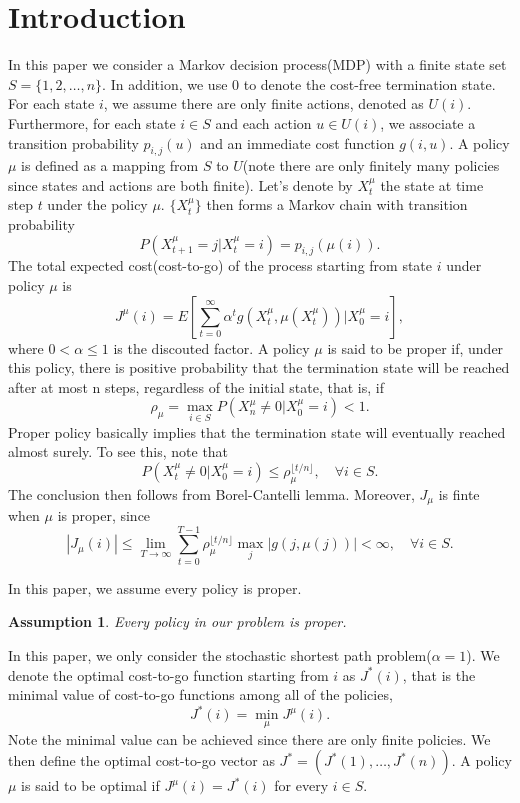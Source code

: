 \documentclass[12pt,a4paper]{amsart}
\numberwithin{equation}{section}
\theoremstyle{plain}
\newtheorem{Assump}[Th]{Assumption}
\theoremstyle{definition}
\begin{document}
\section{Introduction}
In this paper we consider a Markov decision process(MDP) with a finite state set $S = \{1, 2, \dots, n\}$.  In addition, we use 0 to denote the cost-free termination state. For each state $i$, we assume there are only finite actions, denoted as $U(i)$. Furthermore, for each state $i \in S$ and  each action $u \in U(i)$, we associate a transition probability $p_{i,j} (u)$ and an immediate cost function $g(i, u)$. A policy $\mu$ is defined as a mapping from $S$ to $U$(note there are only finitely many policies since states and actions are both finite). Let's denote by $X_t^{\mu}$ the state at time step $t$ under the policy $\mu$. $\{X_t^{\mu}\}$ then forms a Markov chain with transition probability
$$
P(X_{t+1}^{\mu} = j | X_t^{\mu} = i ) = p_{i,j} (\mu(i)). 
$$
The total expected cost(cost-to-go) of the process starting from state $i$ under policy $\mu$ is
$$
J^{\mu}(i) = E\left[ \sum_{t=0}^{\infty} \alpha^{t} g(X_t^{\mu}, \mu(X_t^{\mu}))  \big| X_0^{\mu} = i\right],
$$
where $0< \alpha \leq 1$ is the discouted factor.  A policy $\mu$ is said to be proper if, under this policy, there is positive probability that the termination state will be reached after at most n steps, regardless of the initial state, that is, if
$$
\rho_{\mu} = \max_{i \in S} P(X_n^{\mu} \ne 0 | X_0^{\mu} = i) < 1. 
$$
Proper policy basically implies that the termination state will eventually reached almost surely.  To see this, note that
$$
P(X_t^{\mu} \ne 0 | X_0^{\mu} = i) \le \rho_{\mu}^{ \lfloor t/n \rfloor}, \quad \forall i \in S.
$$
The conclusion then follows from Borel-Cantelli lemma. Moreover, $J_{\mu}$ is finte when $\mu$ is proper, since
$$
|J_{\mu}(i)| \le \lim_{T\to \infty} \sum_{t=0}^{T-1} \rho_{\mu}^{\lfloor t /n \rfloor} \max_{j} |g(j, \mu(j))| < \infty, \quad \forall i \in S.  
$$

In this paper, we assume every policy is proper.
\begin{Assump} \label{assumption}
	Every policy in our problem is proper. 
\end{Assump}

In this paper, we only consider the stochastic shortest path problem($\alpha = 1$).  We denote the optimal cost-to-go function  starting from $i$ as $J^{*}(i)$, that is the minimal value of cost-to-go functions among all of the policies, 
$$
J^{*}(i) = \min_{\mu} J^{\mu} (i).
$$
Note the minimal value can be achieved since there are only finite policies. We then define the optimal cost-to-go vector as $J^{*} = (J^{*}(1), \dots, J^{*}(n) ).$ A policy $\mu$ is said to be optimal if $J^{\mu}(i) = J^{*}(i)$ for every $i \in S$. 
\end{document}
